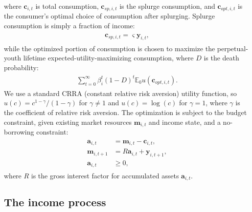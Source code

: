 \documentclass[qe]{econsocart}
\begin{document}
{\noindent}where $\mathbf{c}_{i,t}$ is total consumption, $\mathbf{c}_{sp,i,t}$ is the splurge consumption, and $\mathbf{c}_{opt,i,t}$ is the consumer's optimal choice of consumption after splurging.
Splurge consumption is simply a fraction of income:
\begin{equation}
  \begin{gathered}
    \begin{aligned}
      \mathbf{c}_{sp,i,t} = \varsigma \mathbf{y}_{i,t},
    \end{aligned}
  \end{gathered}
\end{equation}
while the optimized portion of consumption is chosen to maximize the perpetual-youth lifetime expected-utility-maximizing consumption, where $D$ is the death probability:
\begin{equation}
  \begin{gathered}
    \begin{aligned}
      \sum_{t=0}^{\infty}\beta_i^t {(1-D)}^t \mathbb{E}_0 u(\mathbf{c}_{opt,i,t}).
    \end{aligned}
  \end{gathered}
\end{equation}
We use a standard CRRA (constant relative risk aversion) utility function, so $u(c) = c^{1-\gamma}/(1-\gamma)$ for $\gamma \neq 1$ and $u(c) = \log(c)$ for $\gamma=1$, where $\gamma$ is the coefficient of relative risk aversion.
The optimization is subject to the budget constraint, given existing market resources $\mathbf{m}_{i,t}$ and income state, and a no-borrowing constraint:
\begin{equation}
  \begin{gathered}
    \begin{aligned}
      \mathbf{a}_{i,t}   & = \mathbf{m}_{i,t} - \mathbf{c}_{i,t},     \\
      \mathbf{m}_{i,t+1} & = R \mathbf{a}_{i,t} + \mathbf{y}_{i,t+1}, \\
      \mathbf{a}_{i,t}   & \geq 0,
    \end{aligned}
  \end{gathered}
\end{equation}
where $R$ is the gross interest factor for accumulated assets $\mathbf{a}_{i,t}$.

\subsection{The income process}\label{the-income-process}
\end{document}
